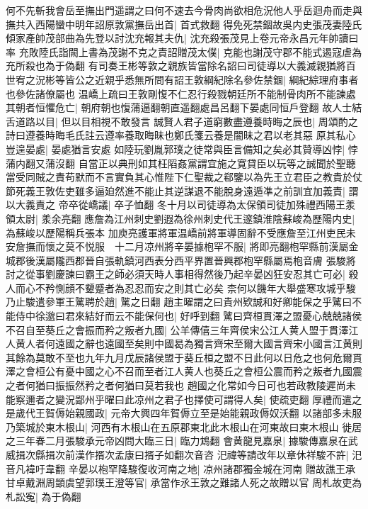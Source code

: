 何不先斬我會岳至撫出門遥謂之曰何不速去今骨肉尚欲相危況他人乎岳迴舟而走與撫共入西陽蠻中明年詔原敦黨撫岳出首|{
	首式救翻}
得免死禁錮故吳内史張茂妻陸氏傾家產帥茂部曲為先登以討沈充報其夫仇|{
	沈充殺張茂見上卷元帝永昌元年帥讀曰率}
充敗陸氏詣闕上書為茂謝不克之責詔贈茂太僕|{
	克能也謝茂守郡不能式遏寇虐為充所殺也為于偽翻}
有司奏王彬等敦之親族皆當除名詔曰司徒導以大義滅親猶將百世宥之況彬等皆公之近親乎悉無所問有詔王敦綱紀除名參佐禁錮|{
	綱紀綜理府事者也參佐諸僚屬也}
温嶠上疏曰王敦剛愎不仁忍行殺戮朝廷所不能制骨肉所不能諫處其朝者恒懼危亡|{
	朝府朝也愎蒲逼翻朝直遥翻處昌呂翻下晏處同恒戶登翻}
故人士結舌道路以目|{
	但以目相視不敢發言}
誠賢人君子道窮數盡遵養時晦之辰也|{
	周頌酌之詩曰遵養時晦毛氏註云遵率養取晦昧也鄭氏箋云養是闇昧之君以老其惡}
原其私心豈遑晏處|{
	晏處猶言安處}
如陸玩劉胤郭璞之徒常與臣言備知之矣必其贊導凶悖|{
	悖蒲内翻又蒲沒翻}
自當正以典刑如其枉䧟姦黨謂宜施之寛貸臣以玩等之誠聞於聖聽當受同賊之責苟默而不言實負其心惟陛下仁聖裁之郗鑒以為先王立君臣之教貴於仗節死義王敦佐吏雖多逼廹然進不能止其逆謀退不能脫身遠遁凖之前訓宜加義責|{
	謂以大義責之}
帝卒從嶠議|{
	卒子恤翻}
冬十月以司徒導為太保領司徒加殊禮西陽王羕領太尉|{
	羕余亮翻}
應詹為江州刺史劉遐為徐州刺史代王邃鎮淮陰蘇峻為歷陽内史|{
	為蘇峻以歷陽稱兵張本}
加庾亮護軍將軍温嶠前將軍導固辭不受應詹至江州吏民未安詹撫而懷之莫不悦服　十二月凉州將辛晏據枹罕不服|{
	將即亮翻枹罕縣前漢屬金城郡後漢屬隴西郡晉自張軌鎮河西表分西平界置晉興郡枹罕縣屬焉枹音膚}
張駿將討之從事劉慶諫曰霸王之師必須天時人事相得然後乃起辛晏凶狂安忍其亡可必|{
	殺人而心不矜惻顔不顰蹙者為忍忍而安之則其亡必矣}
柰何以饑年大舉盛寒攻城乎駿乃止駿遣參軍王騭聘於趙|{
	騭之日翻}
趙主曜謂之曰貴州欵誠和好卿能保之乎騭曰不能侍中徐邈曰君來結好而云不能保何也|{
	好呼到翻}
騭曰齊桓貫澤之盟憂心兢兢諸侯不召自至葵丘之會振而矜之叛者九國|{
	公羊傳僖三年齊侯宋公江人黄人盟于貫澤江人黄人者何遠國之辭也遠國至矣則中國曷為獨言齊宋至爾大國言齊宋小國言江黄則其餘為莫敢不至也九年九月戊辰諸侯盟于葵丘桓之盟不日此何以日危之也何危爾貫澤之會桓公有憂中國之心不召而至者江人黄人也葵丘之會桓公震而矜之叛者九國震之者何猶曰振振然矜之者何猶曰莫若我也}
趙國之化常如今日可也若政教陵遲尚未能察邇者之變況鄙州乎曜曰此凉州之君子也擇使可謂得人矣|{
	使疏吏翻}
厚禮而遣之　是歲代王賀傉始親國政|{
	元帝大興四年賀傉立至是始能親政傉奴沃翻}
以諸部多未服乃築城於東木根山|{
	河西有木根山在五原郡東北此木根山在河東故曰東木根山}
徙居之三年春二月張駿承元帝凶問大臨三日|{
	臨力鴆翻}
會黄龍見嘉泉|{
	據駿傳嘉泉在武威揖次縣揖次前漢作揟次孟康曰揟子如翻次音咨}
汜禕等請改年以章休祥駿不許|{
	汜音凡褘吁韋翻}
辛晏以枹罕降駿復收河南之地|{
	凉州諸郡獨金城在河南}
贈故譙王承甘卓戴淵周顗虞望郭璞王澄等官|{
	承當作氶王敦之難諸人死之故贈以官}
周札故吏為札訟寃|{
	為于偽翻}

